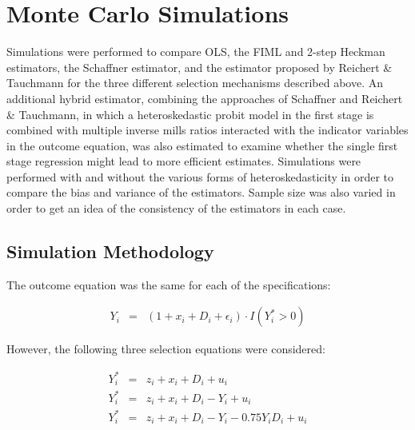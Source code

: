 \documentclass{article}
\begin{document}

\section{Monte Carlo Simulations}
Simulations were performed to compare OLS, the FIML and 2-step Heckman estimators, the Schaffner estimator, and the estimator proposed by Reichert \& Tauchmann for the three different selection mechanisms described above. An additional hybrid estimator, combining the approaches of Schaffner and Reichert \& Tauchmann, in which a heteroskedastic probit model in the first stage is combined with multiple inverse mills ratios interacted with the indicator variables in the outcome equation, was also estimated to examine whether the single first stage regression might lead to more efficient estimates.  Simulations were performed with and without the various forms of heteroskedasticity in order to compare the bias and variance of the estimators.  Sample size was also varied in order to get an idea of the consistency of the estimators in each case.

\subsection{Simulation Methodology}

The outcome equation was the same for each of the specifications:

\begin{eqnarray*}
Y_i&=&(1 + x_i + D_i + \epsilon_i)\cdot I(Y^*_i>0)
\end{eqnarray*}

\noindent However, the following three selection equations were considered:

\begin{eqnarray}
Y^*_i&=& z_i + x_i + D_i + u_i \\
Y^*_i&=& z_i + x_i + D_i - Y_i + u_i  \\
Y^*_i&=& z_i + x_i + D_i - Y_i - 0.75Y_iD_i + u_i
\end{eqnarray}
\end{document}
